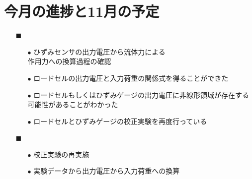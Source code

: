\documentclass[twocolumn,a4j]{jsarticle}
\begin{document}
\section{今月の進捗と11月の予定}
\begin{itemize}
    \item [$\blacksquare$] 
          \begin{itemize}
              \item [$\bullet$] ひずみセンサの出力電圧から流体力による\\
                    作用力への換算過程の確認
              \item [$\bullet$] ロードセルの出力電圧と入力荷重の関係式を得ることができた
              \item [$\bullet$] ロードセルもしくはひずみゲージの出力電圧に非線形領域が存在する可能性があることがわかった
              \item [$\bullet$] ロードセルとひずみゲージの校正実験を再度行っている\\
          \end{itemize}
    \item [$\blacksquare$] 
          \begin{itemize}
              \item [$\bullet$] 校正実験の再実施
              \item [$\bullet$] 実験データから出力電圧から入力荷重への換算\\
          \end{itemize}
\end{itemize}
\end{document}
